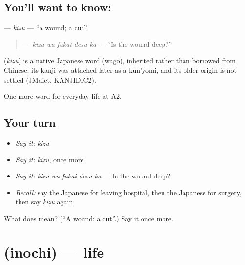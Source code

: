 \subsection*{You'll want to know: }
\textbf{} — \emph{kizu} — \textquotedblleft{}a wound; a cut\textquotedblright{}.

\begin{quote}
\textbf{ } — \emph{kizu wa fukai desu ka} — \textquotedblleft{}Is the wound deep?\textquotedblright{}
\end{quote}

\begin{cousinweb}
\textbf{} (\emph{kizu}) is a native Japanese word (wago), inherited rather than borrowed from Chinese; its kanji was attached later as a kun'yomi, and its older origin is not settled (JMdict, KANJIDIC2).
\end{cousinweb}

\begin{grammarlens}[title={What you've built}]
One more word for everyday life at A2.
\end{grammarlens}

\subsection*{Your turn}
\begin{itemize}
\raggedright
  \item \emph{Say it:} \emph{kizu}
  \item \emph{Say it:} \emph{kizu}, once more
  \item \emph{Say it:} \emph{kizu wa fukai desu ka} — Is the wound deep?
  \item \emph{Recall:} say the Japanese for leaving hospital, then the Japanese for surgery, then say \emph{kizu} again
\end{itemize}

\begin{tcolorbox}[breakable,colback=teal!4,colframe=teal!35!black,title={Before you move on}]
What does  mean? (\textquotedblleft{}A wound; a cut\textquotedblright{}.) Say it once more.
\end{tcolorbox}
\section[\texorpdfstring{\ja{いのち} (inochi)}{いのち (inochi)}]{ (inochi) — life}

\label{lesson:JA-C218-inochi}



